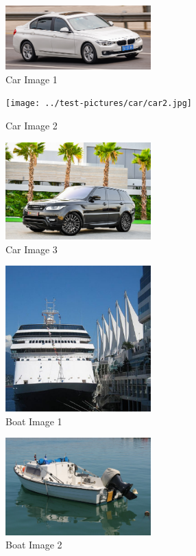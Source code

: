 \begin{figure}[h]
   \centering
   \includegraphics[width=0.5\textwidth]{../test-pictures/car/car1.jpg}
   \caption{Car Image 1}
   \label{fig:car1}
\end{figure}

\begin{figure}[h]
   \centering
   \texttt{[image: ../test-pictures/car/car2.jpg]}
   \caption{Car Image 2}
   \label{fig:car2}
\end{figure}

\begin{figure}[h]
   \centering
   \includegraphics[width=0.5\textwidth]{../test-pictures/car/car3.jpg}
   \caption{Car Image 3}
   \label{fig:car3}
\end{figure}

\begin{figure}[h]
   \centering
   \includegraphics[width=0.5\textwidth]{../test-pictures/boat/boat1.jpg}
   \caption{Boat Image 1}
   \label{fig:boat1}
\end{figure}

\begin{figure}[h]
   \centering
   \includegraphics[width=0.5\textwidth]{../test-pictures/boat/boat2.jpg}
   \caption{Boat Image 2}
   \label{fig:boat2}
\end{figure}

